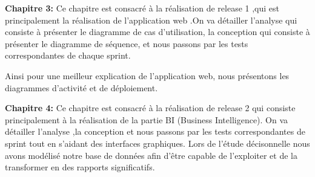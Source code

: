 \bigskip

\textbf{Chapitre 3:}
Ce chapitre est consacr\'{e} à la r\'{e}alisation de release 1 ,qui est principalement la r\'{e}alisation de l'application
web .On va d\'{e}tailler l'analyse qui consiste à pr\'{e}senter le
diagramme de cas d'utilisation, la conception
qui consiste à pr\'{e}senter le diagramme de s\'{e}quence,
et nous passons par les tests correspondantes de chaque sprint.

Ainsi pour une meilleur explication de l'application web, nous pr\'{e}sentons les diagrammes
d'activit\'{e} et de d\'{e}ploiement.
\newline

\textbf{Chapitre 4:}
Ce chapitre est consacr\'{e} à la r\'{e}alisation de release 2 qui consiste  principalement à la r\'{e}alisation de la partie BI (Business Intelligence).
On va d\'{e}tailler l'analyse ,la conception et nous passons  par les tests correspondantes de sprint tout en s'aidant des
interfaces graphiques.
Lors de l'\'{e}tude décisonnelle nous avons mod\'{e}lis\'{e} notre base de donn\'{e}es afin d'\^{e}tre capable de
l'exploiter et de la transformer en des rapports significatifs.






